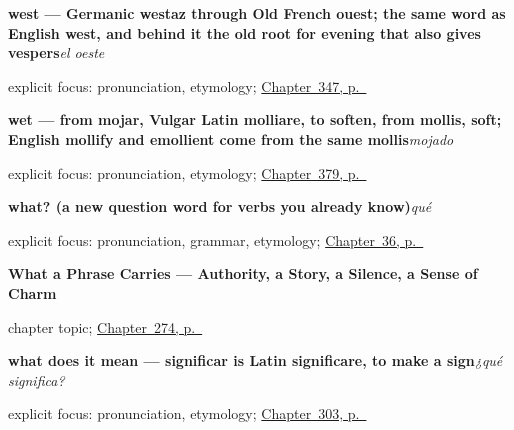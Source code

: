 \noindent\begin{minipage}[t]{\linewidth}
\raggedright
\textbf{west — Germanic westaz through Old French ouest; the same word as English west, and behind it the old root for evening that also gives vespers}\enspace\emph{el oeste}\par
\footnotesize explicit focus: pronunciation, etymology; \hyperref[ch:el-norte-y-el-sur]{Chapter~347, p.~\pageref*{ch:el-norte-y-el-sur}}
\end{minipage}\par\smallskip

\noindent\begin{minipage}[t]{\linewidth}
\raggedright
\textbf{wet — from mojar, Vulgar Latin molliare, to soften, from mollis, soft; English mollify and emollient come from the same mollis}\enspace\emph{mojado}\par
\footnotesize explicit focus: pronunciation, etymology; \hyperref[ch:seco-y-mojado]{Chapter~379, p.~\pageref*{ch:seco-y-mojado}}
\end{minipage}\par\smallskip

\noindent\begin{minipage}[t]{\linewidth}
\raggedright
\textbf{what? (a new question word for verbs you already know)}\enspace\emph{qué}\par
\footnotesize explicit focus: pronunciation, grammar, etymology; \hyperref[ch:spanish-beber-preguntas]{Chapter~36, p.~\pageref*{ch:spanish-beber-preguntas}}
\end{minipage}\par\smallskip

\noindent\begin{minipage}[t]{\linewidth}
\raggedright
\textbf{What a Phrase Carries --- Authority, a Story, a Silence, a Sense of Charm}\par
\footnotesize chapter topic; \hyperref[ch:peso-cultural]{Chapter~274, p.~\pageref*{ch:peso-cultural}}
\end{minipage}\par\smallskip

\noindent\begin{minipage}[t]{\linewidth}
\raggedright
\textbf{what does it mean — significar is Latin significare, to make a sign}\enspace\emph{¿qué significa?}\par
\footnotesize explicit focus: pronunciation, etymology; \hyperref[ch:reparaciones]{Chapter~303, p.~\pageref*{ch:reparaciones}}
\end{minipage}\par\smallskip

